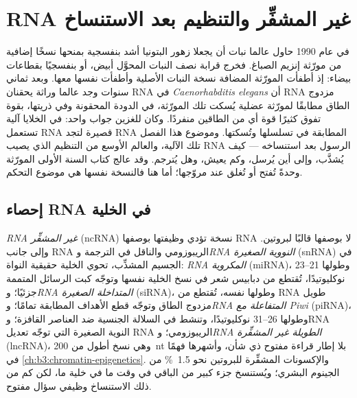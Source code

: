\chapter{RNA غير المشفِّر والتنظيم بعد الاستنساخ}\label{ch:b3:rna-regulation}

في عام 1990 حاول عالما نبات أن يجعلا زهور البتونيا أشد بنفسجية بمنحها
نسخًا إضافية من مورّثة إنزيم الصباغ. فخرج قرابة نصف النبات المحوَّل
أبيض، أو بنفسجيًا بقطاعات بيضاء: إذ أطفأت المورّثة المضافة نسخة
النبات الأصلية وأطفأت نفسها معها. وبعد ثماني سنوات وجد عالما وراثة
يحقنان RNA في \emph{Caenorhabditis elegans} أن RNA مزدوج الطاق
مطابقًا لمورّثة عضلية يُسكت تلك المورّثة، في الدودة المحقونة وفي
ذريتها، بقوة تفوق كثيرًا قوة أي من الطاقين منفردًا. وكان للغزين جواب
واحد: في الخلايا آلية تستعمل RNA قصيرة لتجد RNA المطابقة في تسلسلها
وتُسكتها. وموضوع هذا الفصل تلك الآلية، والعالم الأوسع من التنظيم الذي
يصيب RNA الرسول بعد استنساخه --- كيف يُشذَّب، وإلى أين يُرسل، وكم
يعيش، وهل يُترجم. وقد عالج كتاب السنة الأولى المورّثة وحدةً تُفتح أو
تُغلق عند مروّجها؛ أما هنا فالنسخة نفسها هي موضوع التحكم.

\section{إحصاء RNA في الخلية}

\begin{definition}\label{def:b3:rna-regulation:ncrna}
\emph{RNA غير المشفِّر} (ncRNA) نسخة تؤدي وظيفتها بوصفها RNA لا بوصفها
قالبًا لبروتين. وإلى جانب RNA الريبوزومي والناقل في الترجمة و\emph{RNA
النووية الصغيرة} (snRNA) في الجسيم المشذِّب، تحوي الخلية حقيقية النواة:
\emph{RNA المكروية} (miRNA)، وطولها \numrange{21}{23} نوكليوتيدًا،
تُقتطع من دبابيس شعر في نسخ الخلية نفسها وتوجّه كبت الرسائل المتممة
جزئيًا؛ و\emph{RNA المتداخلة الصغيرة} (siRNA)، وطولها نفسه، تُقتطع من
RNA طويل مزدوج الطاق وتوجّه قطع الأهداف المطابقة تمامًا؛ و\emph{RNA
المتفاعلة مع Piwi} (piRNA)، وطولها \numrange{26}{31} نوكليوتيدًا،
وتنشط في السلالة الجنسية ضد العناصر القافزة؛ وRNA النوية الصغيرة التي
توجّه تعديل RNA الريبوزومي؛ و\emph{RNA الطويلة غير المشفِّرة} (lncRNA)،
وهي نسخ أطول من \qty{200}{nt} بلا إطار قراءة مفتوح ذي شأن، وأشهرها
فهمًا \emph{} في \cref{ch:b3:chromatin-epigenetics}. والإكسونات
المشفِّرة للبروتين نحو \qty{1.5}{\%} من الجينوم البشري؛ ويُستنسخ جزء
كبير من الباقي في وقت ما في خلية ما، لكن كم من ذلك الاستنساخ وظيفي
سؤال مفتوح.
\end{definition}

